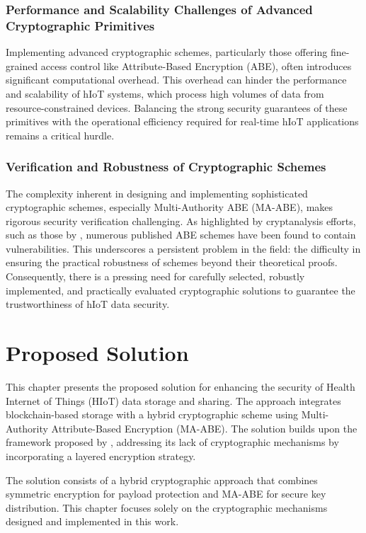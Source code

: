 \documentclass[cic,tc,english]{iiufrgs}
\begin{document}
        \subsection{Performance and Scalability Challenges of Advanced Cryptographic Primitives}
            Implementing advanced cryptographic schemes, particularly those offering fine-grained access control like Attribute-Based Encryption (ABE), often introduces significant computational overhead. This overhead can hinder the performance and scalability of hIoT systems, which process high volumes of data from resource-constrained devices. Balancing the strong security guarantees of these primitives with the operational efficiency required for real-time hIoT applications remains a critical hurdle.

        \subsection{Verification and Robustness of Cryptographic Schemes}
            The complexity inherent in designing and implementing sophisticated cryptographic schemes, especially Multi-Authority ABE (MA-ABE), makes rigorous security verification challenging. As highlighted by cryptanalysis efforts, such as those by \citet{broken2020}, numerous published ABE schemes have been found to contain vulnerabilities. This underscores a persistent problem in the field: the difficulty in ensuring the practical robustness of schemes beyond their theoretical proofs. Consequently, there is a pressing need for carefully selected, robustly implemented, and practically evaluated cryptographic solutions to guarantee the trustworthiness of hIoT data security.

\chapter{Proposed Solution}
    \label{chap:proposedsolution}
    This chapter presents the proposed solution for enhancing the security of Health Internet of Things (HIoT) data storage and sharing. The approach integrates blockchain-based storage with a hybrid cryptographic scheme using Multi-Authority Attribute-Based Encryption (MA-ABE). The solution builds upon the framework proposed by \citet{laura2023}, addressing its lack of cryptographic mechanisms by incorporating a layered encryption strategy.

    The solution consists of a hybrid cryptographic approach that combines symmetric encryption for payload protection and MA-ABE for secure key distribution. This chapter focuses solely on the cryptographic mechanisms designed and implemented in this work.
\end{document}
